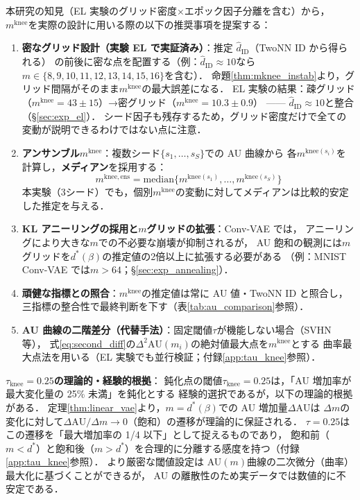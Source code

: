 \documentclass[11pt,a4paper]{jsarticle}
\newcommand{\mknee}{m^{\mathrm{knee}}}
\begin{document}
本研究の知見（EL 実験のグリッド密度×エポック因子分離を含む）から，
$\mknee$を実際の設計に用いる際の以下の推奨事項を提案する：
\begin{enumerate}
  \item \textbf{密なグリッド設計（実験 EL で実証済み）}：推定 $\hat{d}_\mathrm{ID}$（TwoNN ID から得られる）
        の前後に密な点を配置する（例：$\hat{d}_\mathrm{ID} \approx 10$なら$m \in \{8,9,10,11,12,13,14,15,16\}$を含む）．
        命題\ref{thm:mknee_instab}より，グリッド間隔がそのまま$\mknee$の最大誤差になる．
        EL 実験の結果：疎グリッド（$\mknee=43\pm15$）→密グリッド（$\mknee=10.3\pm0.9$）
        —— $\hat{d}_\mathrm{ID} \approx 10$と整合（§\ref{sec:exp_el}）．
        シード因子も残存するため，グリッド密度だけで全ての変動が説明できるわけではない点に注意．
  \item \textbf{アンサンブル$\mknee$}：複数シード$\{s_1,\ldots,s_S\}$での AU 曲線から
        各$m^{\mathrm{knee}(s_i)}$を計算し，\textbf{メディアン}を採用する：
        \begin{equation}
          m^{\mathrm{knee,ens}} = \mathrm{median}\bigl\{m^{\mathrm{knee}(s_1)}, \ldots, m^{\mathrm{knee}(s_S)}\bigr\}
          \label{eq:mknee_ens}
        \end{equation}
        本実験（3シード）でも，個別$\mknee$の変動に対してメディアンは比較的安定した推定を与える．
  \item \textbf{KL アニーリングの採用と$m$グリッドの拡張}：Conv-VAE では，
        アニーリングにより大きな$m$での不必要な崩壊が抑制されるが，
        AU 飽和の観測には$m$グリッドを$d^*(\beta)$の推定値の2倍以上に拡張する必要がある
        （例：MNIST Conv-VAE では$m > 64$；§\ref{sec:exp_annealing}）．
  \item \textbf{頑健な指標との照合}：$\mknee$の推定値は常に AU 値・TwoNN ID と照合し，
        三指標の整合性で最終判断を下す（表\ref{tab:au_comparison}参照）．
  \item \textbf{AU 曲線の二階差分（代替手法）}：固定閾値$\tau$が機能しない場合（SVHN 等），
        式\eqref{eq:second_diff}の$\Delta^2\mathrm{AU}(m_i)$の絶対値最大点を$\mknee$とする
        曲率最大点法を用いる（EL 実験でも並行検証；付録\ref{app:tau_knee}参照）．
\end{enumerate}

\textbf{$\tau_{\mathrm{knee}} = 0.25$の理論的・経験的根拠}：
鈍化点の閾値$\tau_{\mathrm{knee}} = 0.25$は，「AU 増加率が最大変化量の 25\% 未満」を鈍化とする
経験的選択であるが，以下の理論的根拠がある．
定理\ref{thm:linear_vae}より，$m = d^*(\beta)$での AU 増加量$\Delta\mathrm{AU}$は
$\Delta m$の変化に対して$\Delta\mathrm{AU}/\Delta m \to 0$（飽和）の遷移が理論的に保証される．
$\tau = 0.25$はこの遷移を「最大増加率の 1/4 以下」として捉えるものであり，
飽和前（$m < d^*$）と飽和後（$m > d^*$）を合理的に分離する感度を持つ（付録\ref{app:tau_knee}参照）．
より厳密な閾値設定は AU$(m)$曲線の二次微分（曲率）最大化に基づくことができるが，
AU の離散性のため実データでは数値的に不安定である．
\end{document}

